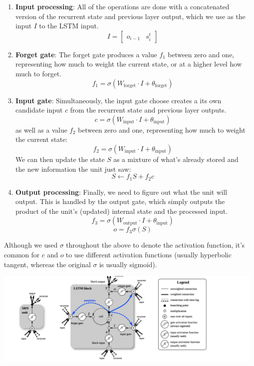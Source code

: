 \documentclass{article}
\begin{document}
\begin{enumerate}
    \item \textbf{Input processing}: All of the operations are done with a concatenated version of the recurrent state and previous layer output, which we use as the input $ I $ to the LSTM input.
$$ I = \begin{bmatrix} o_{i - 1} & s_i^t \end{bmatrix} $$
\item \textbf{Forget gate}: The forget gate produces a value $ f_1 $ between zero and one, representing how much to weight the current state, or at a higher level how much to forget.
$$ f_1 = \sigma(W_{\text{forget}} \cdot I + \theta_{\text{forget}}) $$
    \item \textbf{Input gate}: Simultaneously, the input gate choose creates a its own candidate input $ c $ from the recurrent state and previous layer outputs.
$$ c = \sigma(W_{\text{input}} \cdot I + \theta_{\text{input}}) $$
as well as a value $ f_2 $ between zero and one, representing how much to weight the current state:
$$ f_2 = \sigma(W_{\text{input}} \cdot I + \theta_{\text{input}}) $$
We can then update the state $ S $ as a mixture of what's already stored and the new information the unit just saw:
$$ S \gets f_1 S + f_2 c $$
    \item \textbf{Output processing}: Finally, we need to figure out what the unit will output. This is handled by the output gate, which simply outputs the product of the unit's (updated) internal state and the processed input.
$$ f_3 = \sigma(W_{\text{output}} \cdot I + \theta_{\text{input}}) $$
$$ o = f_3 \sigma(S) $$
\end{enumerate}
Although we used $ \sigma $ throughout the above to denote the activation function, it's common for $ c $ and $ o $ to use different activation functions (usually hyperbolic tangent, whereas the original $ \sigma $ is usually sigmoid).

\begin{center}
    \includegraphics[scale=0.4]{images/lstm_diagram.png}
\end{center}
\end{document}
